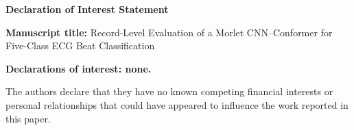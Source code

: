 \documentclass[11pt,a4paper]{article}
\begin{document}
\begin{center}
  \textbf{\Large Declaration of Interest Statement}
\end{center}

\vspace{0.6cm}
\textbf{Manuscript title:} Record-Level Evaluation of a Morlet CNN--Conformer for Five-Class ECG Beat Classification

\vspace{0.6cm}
\textbf{Declarations of interest: none.}

\vspace{0.6cm}
The authors declare that they have no known competing financial interests or personal relationships that could have appeared to influence the work reported in this paper.
\end{document}
